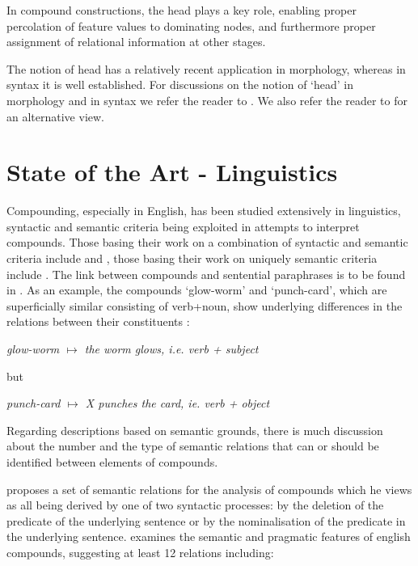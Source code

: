 In compound constructions,  the head plays a key  role,  enabling 
proper  percolation of feature values to  dominating  nodes,  and 
furthermore  proper assignment of relational information at other 
stages.

The  notion  of  head  has a  relatively  recent  application  in 
morphology,  whereas  in  syntax  it  is  well  established.  For 
discussions  on the notion of `head' in morphology and in  syntax 
we refer the reader to \cite{Zwicky85}. We also refer the reader to 
\cite{Corbin87} for an alternative view.
 
\section{State of the Art - Linguistics}

Compounding,  especially in English, has been studied extensively 
in linguistics,  syntactic and semantic criteria being  exploited 
in attempts to interpret compounds.  Those basing their work on a 
combination  of  syntactic  and semantic criteria  include \cite{Adams73}
and \cite{Marchand69},  those  basing  their  work  on  
uniquely  semantic  criteria include \cite{Downing77}.   
The  link  
between  compounds   and sentential paraphrases is to be found in 
\cite{Quirk86}.  As an  example, the compounds `glow-worm' 
and `punch-card', which  are superficially  similar consisting of 
verb+noun,  show  underlying differences in the relations between 
their constituents \cite[p.~1570]{Quirk86}:

\begin{center}
{\em glow-worm $\mapsto$ the worm glows, i.e. verb + subject}
\end{center}
\noindent
but
\begin{center}
{\em punch-card $\mapsto$  X punches the card, ie. verb + object}
\end{center}

Regarding   descriptions   based on semantic  grounds,  there  is  
much  discussion   about  the number and the  type  of   semantic  
relations  that  can or should be identified between elements  of 
compounds.

\cite{Levi78} proposes a set of semantic relations for the analysis 
of  compounds  which he views as all being derived by one of  two 
syntactic  processes:   by the deletion of the predicate  of  the 
underlying  sentence or by the nominalisation of the predicate in 
the underlying sentence. 
\cite{Downing77} examines the semantic and pragmatic features  of 
english compounds, suggesting at least 12 relations including:

